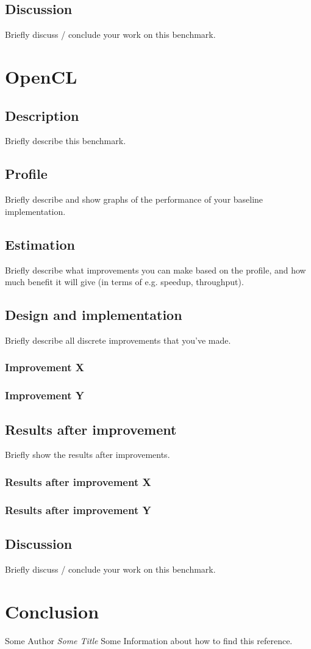 \documentclass[twocolumn]{article}
\begin{document}
\subsection{Discussion}
Briefly discuss / conclude your work on this benchmark.

\section{OpenCL}
\subsection{Description}
Briefly describe this benchmark.
\subsection{Profile}
Briefly describe and show graphs of the performance of your baseline implementation.
\subsection{Estimation}
Briefly describe what improvements you can make based on the profile, and how much benefit it will give (in terms of e.g. speedup, throughput).
\subsection{Design and implementation}
Briefly describe all discrete improvements that you've made.
\subsubsection{Improvement X}
\subsubsection{Improvement Y}
\subsection{Results after improvement}
Briefly show the results after improvements.
\subsubsection{Results after improvement X}
\subsubsection{Results after improvement Y}
\subsection{Discussion}
Briefly discuss / conclude your work on this benchmark.

\section{Conclusion}

\begin{thebibliography}{}
Some Author
\textit{Some Title}
Some Information about how to find this reference.
\end{thebibliography}
\end{document}
